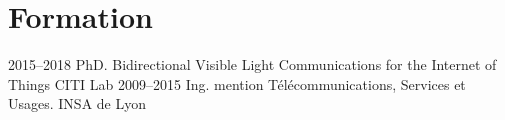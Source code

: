 \documentclass[]{cv-style}          %
\begin{document}
\section{Formation}

\begin{entrylist}
\entry
{2015--2018}
{PhD. {\normalfont Bidirectional Visible Light Communications for the Internet of Things}}
{CITI Lab}
{}
\entry
{2009--2015}
{Ing. {\normalfont mention Télécommunications, Services et Usages.}}
{INSA de Lyon}
{ \\
}
\end{entrylist}





\end{document}
